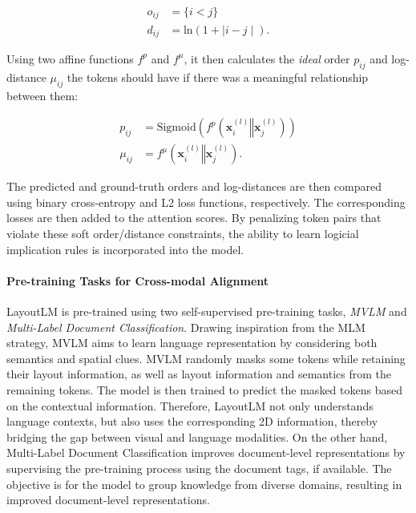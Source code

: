 \begin{align}
    o_{ij} &= \{i < j\} \\
    d_{ij} &= \text{ln}(1 + \mid i - j \mid).
\end{align}

\noindent Using two affine functions $f^p$ and $f^{\mu}$, it then calculates the \textit{ideal} order $p_{ij}$ and log-distance $\mu_{ij}$ the tokens should have if there was a meaningful relationship between them:

\begin{align}
    p_{ij} &= \text{Sigmoid}\left(f^p(\bm{x}^{(l)}_i \mathbin\Vert \bm{x}^{(l)}_j)\right)\\
    \mu_{ij} &= f^{\mu}(\bm{x}^{(l)}_i \mathbin\Vert \bm{x}^{(l)}_j).
\end{align}

\noindent The predicted and ground-truth orders and log-distances are then compared using binary cross-entropy and L2 loss functions, respectively. The corresponding losses are then added to the attention scores. By penalizing token pairs that violate these soft order/distance constraints, the ability to learn logicial implication rules is incorporated into the model.


\paragraph{Pre-training Tasks for Cross-modal Alignment}

LayoutLM \citep{xu2020layoutlm} is pre-trained using two self-supervised pre-training tasks, \textit{\ac{MVLM}} and \textit{Multi-Label Document Classification}. Drawing inspiration from the \ac{MLM} strategy, \ac{MVLM} aims to learn language representation by considering both semantics and spatial clues. \ac{MVLM} randomly masks some tokens while retaining their layout information, as well as layout information and semantics from the remaining tokens. The model is then trained to predict the masked tokens based on the contextual information. Therefore, LayoutLM not only understands language contexts, but also uses the corresponding 2D information, thereby bridging the gap between visual and language modalities. On the other hand, Multi-Label Document Classification improves document-level representations by supervising the pre-training process using the document tags, if available. The objective is for the model to group knowledge from diverse domains, resulting in improved document-level representations. 

